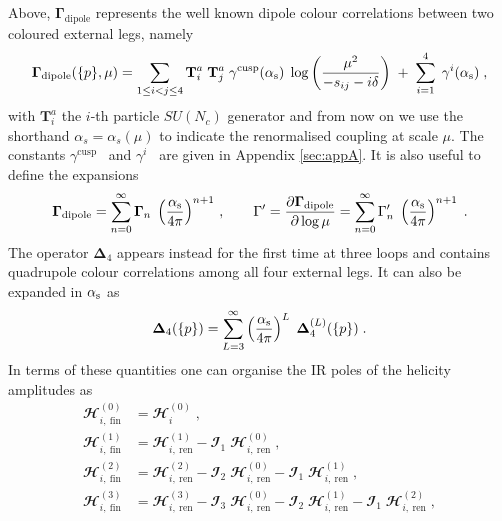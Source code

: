 Above,  $ \mathbf{\Gamma}_\text{dipole}$ represents the well known dipole colour correlations between two coloured external legs, namely 
\begin{equation}\label{dipole}
\mathbf{\Gamma}_{\text{dipole}}(\{p\},\mu)  =  \sum_{1\leq i < j \leq 4} \mathbf{T}^a_i \; \mathbf{T}^a_j \; \gamma^\text{cusp}(\alpha_\mathrm{s}) \; \log\left(\frac{\mu^2}{-s_{ij}-i \delta}\right)  \; + \; \sum_{i=1}^4 \; \gamma^i(\alpha_\mathrm{s}) \; ,
\end{equation}
with $\mathbf{T}^a_i$ the $i$-th particle $SU(N_c)$ generator and from now on we use the shorthand $\alpha_s = \alpha_s(\mu)$ to indicate the renormalised coupling at scale $\mu$.
The constants $\gamma^\text{cusp}$~\cite{Korchemsky:1987wg,Moch:2004pa,Vogt:2004mw,Grozin:2014hna,Henn:2019swt,Huber:2019fxe,vonManteuffel:2020vjv}
and $\gamma^i$~\cite{Ravindran:2004mb,Moch:2005id,Moch:2005tm,Agarwal:2021zft}
are given in Appendix \ref{sec:appA}.  It is also useful to define the expansions 
\begin{equation}
\mathbf{\Gamma}_{\text{dipole}} = \sum_{n=0}^\infty \mathbf{\Gamma}_n \;  \left( \frac{\alpha_\mathrm{s}}{4 \pi} \right)^{n+1}\,, \quad  \quad \Gamma '= \frac{\partial \mathbf{\Gamma}_{\text{dipole}}}{\partial \log \mu} = \sum_{n=0}^\infty \Gamma'_n \;  \left( \frac{\alpha_\mathrm{s}}{4 \pi} \right)^{n+1}\; .
\end{equation} 
The operator $\mathbf{\Delta}_4$ appears instead for the first time at three loops
and contains quadrupole colour correlations among all four external legs.
It can also be expanded in $\alpha_\mathrm{s}$ as
\begin{equation}
\mathbf{\Delta}_4 (\{p\}) = \sum_{L=3}^\infty \left(\frac{\alpha_\mathrm{s}}{4 \pi}\right)^L \; \mathbf{\Delta}^{(L)}_4 (\{p\}) \; .  \label{delta4}
\end{equation}
In terms of these quantities one can organise the IR poles of the helicity amplitudes as 
\begin{align}
\mathbfcal{H}_{i,\:\text{fin}}^{(0)} &= \mathbfcal{H}_{i}^{(0)} \; ,  \label{tree}\\ %
\mathbfcal{H}_{i,\:\text{fin}}^{(1)} &= \mathbfcal{H}_{i,\: \text{ren}}^{(1)} - \mathbfcal{I}_1 \; \mathbfcal{H}_{i,\: \text{ren}}^{(0)} \; , \label{one}  \\ %
\mathbfcal{H}_{i,\:\text{fin}}^{(2)} &= \mathbfcal{H}_{i,\: \text{ren}}^{(2)} - \mathbfcal{I}_2\; \mathbfcal{H}_{i,\: \text{ren}}^{(0)} - \mathbfcal{I}_1\; \mathbfcal{H}_{i,\: \text{ren}}^{(1)} \; ,\label{two}  \\ %
\mathbfcal{H}_{i,\:\text{fin}}^{(3)} &= \mathbfcal{H}_{i,\: \text{ren}}^{(3)} - \mathbfcal{I}_3\; \mathbfcal{H}_{i,\: \text{ren}}^{(0)} - \mathbfcal{I}_2\; \mathbfcal{H}_{i,\: \text{ren}}^{(1)} - \mathbfcal{I}_1 \;\mathbfcal{H}_{i,\: \text{ren}}^{(2)} \; ,\label{three}  
\end{align}
